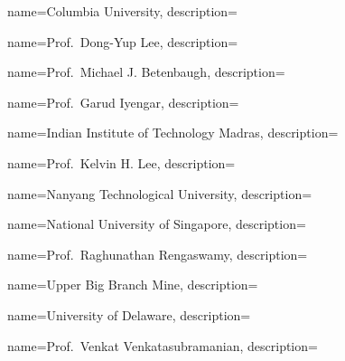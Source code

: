 	{
		name={Columbia University},
		description={}
	}	

	{
		name={Prof.~Dong-Yup Lee},
		description={}
	}	
	
	{
		name={Prof.~Michael J. Betenbaugh},
		description={}		
	}

	{
		name={Prof.~Garud Iyengar},
		description={}
	}	
	
	{
		name={Indian Institute of Technology Madras},
		description={}
	}	

	{
		name={Prof.~Kelvin H. Lee},
		description={}
	}	

	{
		name={Nanyang Technological University},
		description={}
	}	

	{
		name={National University of Singapore},
		description={}
	}	

	{
		name={Prof.~Raghunathan Rengaswamy},
		description={}
	}
	
	{
		name={Upper Big Branch Mine},
		description={}
	}
	
	{
		name={University of Delaware},
		description={}
	}	

	{
		name={Prof.~Venkat Venkatasubramanian},
		description={}
	}






